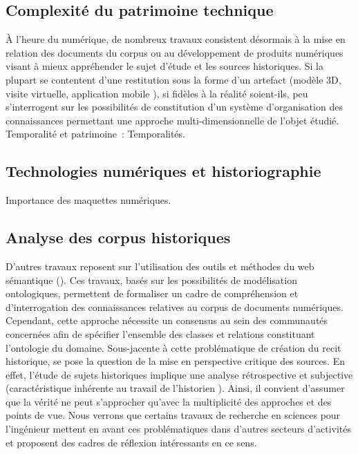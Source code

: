 \documentclass[a4paper,11pt,french]{article}
\begin{document}
\subsection{Complexité du patrimoine technique}

À l'heure du numérique, de nombreux travaux consistent désormais à la mise en relation des documents du corpus ou au développement de produits numériques visant à mieux appréhender le sujet d'étude et les sources historiques. Si la plupart se contentent d'une restitution sous la forme d'un artefact (modèle 3D, visite virtuelle, application mobile ), si fidèles à la réalité soient-ils, peu s'interrogent sur les possibilités de constitution d'un système d'organisation des connaissances permettant une approche multi-dimensionnelle de l'objet étudié\cite{Benoit2010}.\\

Temporalité et patrimoine~:
Temporalités.

\subsection{Technologies numériques et historiographie}

Importance des maquettes numériques\cite{Cotte2009}.
 

\subsection{Analyse des corpus historiques}

D'autres travaux reposent sur l'utilisation des outils et méthodes du web sémantique \cite{Pouyllau2008,Pouyllau2012} (). Ces travaux, basés sur les possibilités de modélisation ontologiques, permettent de formaliser un cadre de compréhension et d'interrogation des connaissances relatives au corpus de documents numériques. Cependant, cette approche nécessite un consensus au sein des communautés concernées afin de spécifier l'ensemble des classes et relations constituant l'ontologie du domaine.
Sous-jacente à cette problématique de création du recit historique, se pose la question de la mise en perspective critique des sources. En effet, l'étude de sujets historiques implique une analyse rétrospective et subjective (caractéristique inhérente au travail de l'historien ). Ainsi, il convient d'assumer que la vérité ne peut s'approcher qu'avec la multiplicité des approches et des points de vue. Nous verrons que certains travaux de recherche en sciences pour l'ingénieur mettent en avant ces problématiques dans d'autres secteurs d'activités et proposent des cadres de réflexion intéressants en ce sens.
\end{document}
